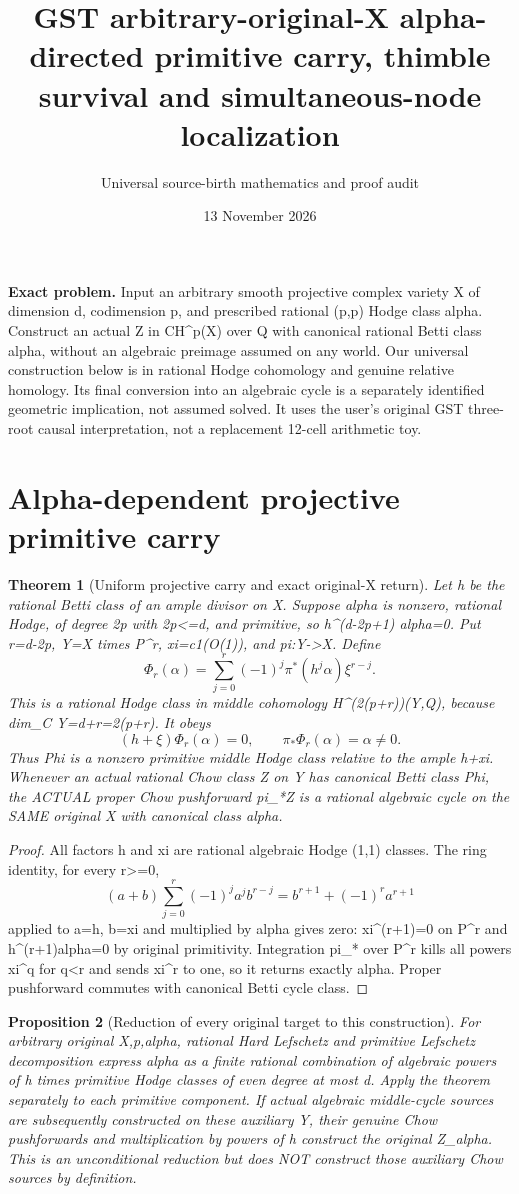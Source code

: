 \documentclass[11pt]{article}
\title{GST arbitrary-original-X alpha-directed primitive carry, thimble survival and simultaneous-node localization}
\author{Universal source-birth mathematics and proof audit}
\date{13 November 2026}
\newtheorem{theorem}{Theorem}[section]
\newtheorem{proposition}[theorem]{Proposition}
\begin{document}
\maketitle
\noindent\textbf{Exact problem.} Input an arbitrary smooth projective complex variety X of dimension d, codimension p, and prescribed rational (p,p) Hodge class alpha. Construct an actual Z in CH^p(X) over Q with canonical rational Betti class alpha, without an algebraic preimage assumed on any world. Our universal construction below is in rational Hodge cohomology and genuine relative homology. Its final conversion into an algebraic cycle is a separately identified geometric implication, not assumed solved. It uses the user's original GST three-root causal interpretation, not a replacement 12-cell arithmetic toy.

\section{Alpha-dependent projective primitive carry}
\begin{theorem}[Uniform projective carry and exact original-X return]
Let h be the rational Betti class of an ample divisor on X. Suppose alpha is nonzero, rational Hodge, of degree 2p with 2p<=d, and primitive, so h^(d-2p+1) alpha=0. Put r=d-2p, Y=X times P^r, xi=c1(O(1)), and pi:Y->X. Define
\[
\boxed{\Phi_r(\alpha)=\sum_{j=0}^{r}(-1)^j\pi^*(h^j\alpha)\xi^{r-j}.}
\]
This is a rational Hodge class in middle cohomology H^(2(p+r))(Y,Q), because dim_C Y=d+r=2(p+r). It obeys
\[
\boxed{(h+\xi)\Phi_r(\alpha)=0,\qquad \pi_*\Phi_r(\alpha)=\alpha\ne0.}
\]
Thus Phi is a nonzero primitive middle Hodge class relative to the ample h+xi. Whenever an actual rational Chow class Z on Y has canonical Betti class Phi, the ACTUAL proper Chow pushforward pi_*Z is a rational algebraic cycle on the SAME original X with canonical class alpha.
\end{theorem}
\begin{proof}
All factors h and xi are rational algebraic Hodge (1,1) classes. The ring identity, for every r>=0,
\[
(a+b)\sum_{j=0}^{r}(-1)^j a^j b^{r-j}
=b^{r+1}+(-1)^r a^{r+1}
\]
applied to a=h, b=xi and multiplied by alpha gives zero: xi^(r+1)=0 on P^r and h^(r+1)alpha=0 by original primitivity. Integration pi_* over P^r kills all powers xi^q for q<r and sends xi^r to one, so it returns exactly alpha. Proper pushforward commutes with canonical Betti cycle class.
\end{proof}
\begin{proposition}[Reduction of every original target to this construction]
For arbitrary original X,p,alpha, rational Hard Lefschetz and primitive Lefschetz decomposition express alpha as a finite rational combination of algebraic powers of h times primitive Hodge classes of even degree at most d. Apply the theorem separately to each primitive component. If actual algebraic middle-cycle sources are subsequently constructed on these auxiliary Y, their genuine Chow pushforwards and multiplication by powers of h construct the original Z_alpha. This is an unconditional reduction but does NOT construct those auxiliary Chow sources by definition.
\end{proposition}
\end{document}
